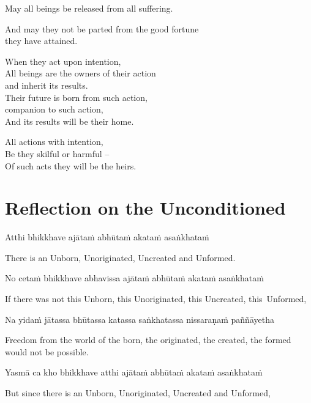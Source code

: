 May all beings be released from all suffering.

And may they not be parted from the good fortune\\
they have attained.

When they act upon intention,\\
All beings are the owners of their action\\
and inherit its results.\\
Their future is born from such action,\\
companion to such action,\\
And its results will be their home.

All actions with intention,\\
Be they skilful or harmful --\\
Of such acts they will be the heirs. 

\section[The Unconditioned]{Reflection on the Unconditioned}

\begin{leader}
\end{leader}


Atthi bhikkhave ajātaṁ abhūtaṁ akataṁ asaṅkhataṁ

\begin{english}
  There is an Unborn, Unoriginated, Uncreated and Unformed.
\end{english}

No cetaṁ bhikkhave abhavissa ajātaṁ abhūtaṁ akataṁ asaṅkhataṁ

\begin{english}
  If there was not this Unborn, this Unoriginated, this Uncreated, this~Unformed,
\end{english}

Na yidaṁ jātassa bhūtassa katassa saṅkhatassa nissaraṇaṁ paññāyetha

\begin{english}
  Freedom from the world of the born, the originated, the created, the formed would not be possible.
\end{english}

Yasmā ca kho bhikkhave atthi ajātaṁ abhūtaṁ akataṁ asaṅkhataṁ

\begin{english}
  But since there is an Unborn, Unoriginated, Uncreated and Unformed,
\end{english}

